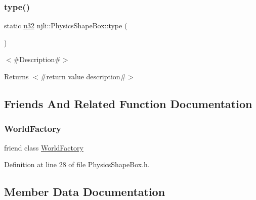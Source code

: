 \subsubsection{\texorpdfstring{type()}{type()}}
{\footnotesize\ttfamily static \mbox{\hyperlink{_util_8h_a10e94b422ef0c20dcdec20d31a1f5049}{u32}} njli\+::\+Physics\+Shape\+Box\+::type (\begin{DoxyParamCaption}{ }\end{DoxyParamCaption})\hspace{0.3cm}{\ttfamily [static]}}

$<$\#\+Description\#$>$

\begin{DoxyReturn}{Returns}
$<$\#return value description\#$>$ 
\end{DoxyReturn}


\subsection{Friends And Related Function Documentation}
\mbox{\label{classnjli_1_1_physics_shape_box_acb96ebb09abe8f2a37a915a842babfac}} 
\subsubsection{\texorpdfstring{World\+Factory}{WorldFactory}}
{\footnotesize\ttfamily friend class \mbox{\hyperlink{classnjli_1_1_world_factory}{World\+Factory}}\hspace{0.3cm}{\ttfamily [friend]}}



Definition at line 28 of file Physics\+Shape\+Box.\+h.



\subsection{Member Data Documentation}
\mbox{\label{classnjli_1_1_physics_shape_box_a2e9169aa7d91d43890ac1e231ebd52a8}} 
